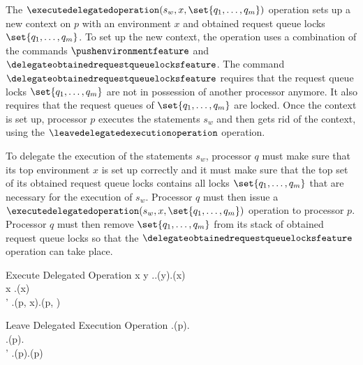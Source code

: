 The $\executedelegatedoperation(s_{w}, x, \set{q_{1}, \ldots, q_{m}})$ operation sets up a new context on $p$ with an environment $x$ and obtained request queue locks $\set{q_{1}, \ldots, q_{m}}$. To set up the new context, the operation uses a combination of the commands $\pushenvironmentfeature$ and $\delegateobtainedrequestqueuelocksfeature$. The command $\delegateobtainedrequestqueuelocksfeature$ requires that the request queue locks $\set{q_{1}, \ldots, q_{m}}$ are not in possession of another processor anymore. It also requires that the request queues of $\set{q_{1}, \ldots, q_{m}}$ are locked. Once the context is set up, processor $p$ executes the statements $s_{w}$ and then gets rid of the context, using the $\leavedelegatedexecutionoperation$ operation.

To delegate the execution of the statements $s_{w}$, processor $q$ must make sure that its top environment $x$ is set up correctly and it must make sure that the top set of its obtained request queue locks contains all locks $\set{q_{1}, \ldots, q_{m}}$ that are necessary for the execution of $s_{w}$. Processor $q$ must then issue a $\executedelegatedoperation(s_{w}, x, \set{q_{1}, \ldots, q_{m}})$ operation to processor $p$. Processor $q$ must then remove $\set{q_{1}, \ldots, q_{m}}$ from its stack of obtained request queue locks so that the $\delegateobtainedrequestqueuelocksfeature$ operation can take place.

\inferencerule
	{Execute Delegated Operation}
	{
		\forall x \in {} \colon \neg \exists y \in \state.\processorsfeature \colon \state.\requestqueuelocksfeature(y).\containsfeature(x) \\
		\forall x \in {} \colon \state.\isrequestqueuelockedfeature(x) \\
		\state' \mathematicaldefinition \state.\pushenvironmentfeature(p, x).\delegateobtainedrequestqueuelocksfeature(p, )
	}
	{}
	{}

\singlelineinferencerule
	{Leave Delegated Execution Operation}
	{
		\neg \state.\environmentsfeature(p).\isemptyfeature \\
		\neg \state.\obtainedrequestqueuelocksfeature(p).\isemptyfeature \\
		\state' \mathematicaldefinition \state.\popenvironmentfeature(p).\popobtainedrequestqueuelocksfeature(p)
	}
	{}
	{}
 
